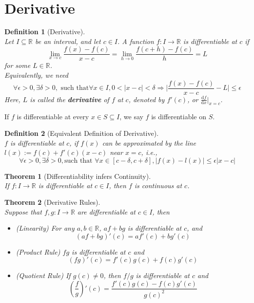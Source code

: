 \documentclass[12pt]{article}
\newcommand{\diff}{\mathrm{d}}
\newtheorem{definition}{Definition}[section]
\newtheorem{theorem}{Theorem}[section]
\theoremstyle{definition}
\begin{document}
\section{Derivative}
\begin{definition}[Derivative]
\hfill\\\normalfont Let $I\subseteq \mathbb{R}$ be an interval, and let $c\in I$. A function $f:I\to \mathbb{R}$ is differentiable at $c$ if
\[
\lim_{x\to c}\frac{f(x)-f(c)}{x-c} = \lim_{h\to 0}\frac{f(c+h)-f(c)}{h} = L
\]
for some $L\in \mathbb{R}$.\\
Equivalently, we need
\[
\forall \epsilon>0, \exists\delta>0,\text{ such that} \forall x\in I, 0<|x-c|<\delta \Rightarrow \lvert \frac{f(x)-f(c)}{x-c}-L\rvert \leq \epsilon
\]
Here, $L$ is called the \textbf{derivative} of $f$ at $c$, denoted by $f'(c)$, or $\frac{\diff f}{\diff x}\rvert_{x=c}$.
\end{definition}
If $f$ is differentiable at every $x\in S\subseteq I$, we say $f$ is differentiable on $S$.
\begin{definition}[Equivalent Definition of Derivative]
\hfill\\\normalfont $f$ is differentiable at $c$, if $f(x)$ can be approximated by the line $l(x):=f(c)+f'(c)(x-c)$ near $x=c$, i.e., 
\[
\forall \epsilon>0, \exists \delta>0, \text{such that } \forall x\in[c-\delta, c+\delta], |f(x)-l(x)|\leq \epsilon|x-c| 
\] 
\end{definition}
\begin{theorem}[Differentiability infers Continuity]
\hfill\\\normalfont If $f:I\to \mathbb{R}$ is differentiable at $c\in I$, then $f$ is continuous at $c$.
\end{theorem}
\begin{theorem}[Derivative Rules]
\hfill\\\normalfont Suppose that $f,g: I\to\mathbb{R}$ are differentiable at $c\in I$, then
\begin{itemize}
	\item (Linearity) For any $a,b\in\mathbb{R}$, $af+bg$ is differentiable at $c$, and
	\[
(af+bg)'(c) = af'(c)+bg'(c)
	\]
	\item (Product Rule) $fg$ is differentiable at $c$ and
	\[
(fg)'(c) = f'(c)g(c)+f(c)g'(c)
	\]
	\item (Quotient Rule) If $g(c)\neq 0$, then $f/g$ is differentiable at $c$ and
	\[
(\frac{f}{g})'(c) = \frac{f'(c)g(c)-f(c)g'(c)}{g(c)^2}
	\]
\end{itemize}
\end{theorem}
\end{document}
